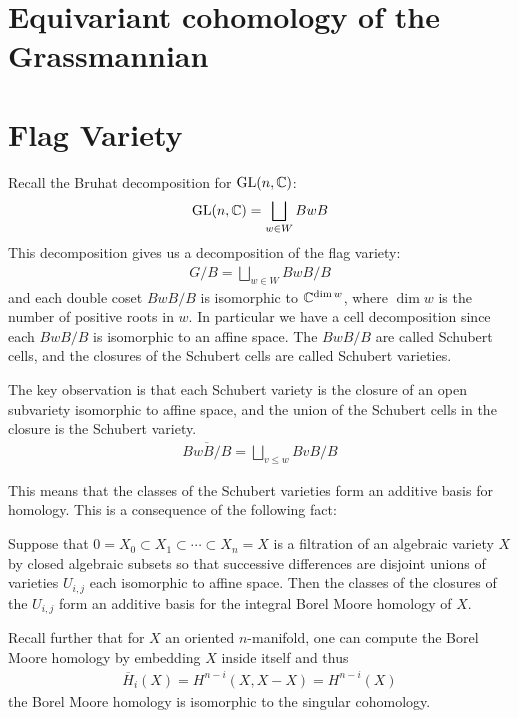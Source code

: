 \documentclass[12pt]{article}
\begin{document}
\section{Equivariant cohomology of the Grassmannian}

\section{Flag Variety}
Recall the Bruhat decomposition for $\operatorname{GL}(n,\mathbb{C})$:
\begin{align*}
	\operatorname{GL}(n,\mathbb{C}) = \bigsqcup_{w \in W} BwB
\end{align*}
This decomposition gives us a decomposition of the flag variety:
\begin{align*}
	G/B = \bigsqcup_{w \in W} BwB/B
\end{align*} and each double coset $BwB/B$ is isomorphic to $\mathbb{C}^{\dim w}$, where $\dim w$ is the number of positive roots in $w$.
In particular we have a cell decomposition since each $BwB/B$ is isomorphic to an affine space.
The $BwB/B$ are called  Schubert cells, and the closures of the Schubert cells are called Schubert varieties.

\hfill

The key observation is that each Schubert variety is the closure of an open subvariety isomorphic to affine space, and
the union of the Schubert cells in the closure is the Schubert variety. \begin{align*}
	\overline{BwB/B} = \bigsqcup_{v \leq w} BvB/B
\end{align*}

This means that the classes of the Schubert varieties form an additive basis for homology. This is a consequence of the following fact:

\begin{theorem}
	Suppose that $0 = X_0 \subset X_1 \subset \cdots \subset X_n = X$ is a filtration of an algebraic variety $X$
	by closed algebraic subsets so that successive differences are disjoint unions of varieties $U_{i,j}$ each isomorphic to affine space. Then the classes
	of the closures of the $U_{i,j}$ form an additive basis for the integral Borel Moore homology of $X$.
\end{theorem}

Recall further that for $X$ an oriented $n$-manifold, one can compute the Borel Moore homology by embedding $X$ inside itself and thus \begin{align*}
	\overline{H}_i(X) = H^{n-i}(X, X - X) = H^{n-i}(X)
\end{align*} the Borel Moore homology is isomorphic to the singular cohomology.
\end{document}
